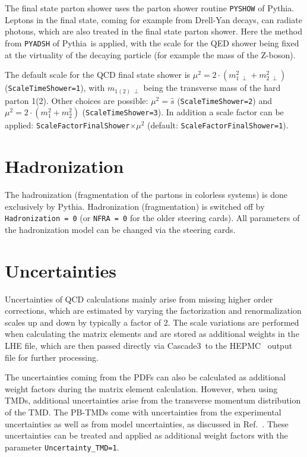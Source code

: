 \documentclass[11pt]{article} \usepackage{mystyle-new}
\def\cascade{{\sc Cascade3}}
\def\PYTHIA{{\sc Pythia}}
\def\PB{{PB}}
\newenvironment{tolerant}[1]{\par\tolerance=#1\relax}{ \par }
\begin{document}
The final state parton shower uses the parton shower routine \verb+PYSHOW+  of \PYTHIA .
Leptons in the final state, coming for example from Drell-Yan decays, can radiate photons, which are also treated in the final state parton shower. Here the method from \verb+PYADSH+ of \PYTHIA\ is applied, with the scale for the QED shower being fixed at the virtuality of the decaying particle (for example the mass of the Z-boson). 

\begin{tolerant}{4000}
The default scale for the QCD final state shower is $\mu^2=2\cdot (m_{1\;\perp}^2+m_{2\;\perp}^2)$ (\verb+ScaleTimeShower=1+),
with $m_{1(2)\;\perp}$ being the transverse mass of the hard parton 1(2). Other choices are possible: $\mu^2=\hat{s}$ (\verb+ScaleTimeShower=2+) and $\mu^2=2\cdot (m_1^2+m_2^2)$ (\verb+ScaleTimeShower=3+). 
In addition a scale factor can be applied: \verb+ScaleFactorFinalShower+$\times\mu^2 $ (default:  \verb+ScaleFactorFinalShower=1+).
\end{tolerant}

\section{Hadronization}
\begin{tolerant}{1000}
The hadronization (fragmentation of the partons in colorless systems) is done exclusively by \PYTHIA . 
Hadronization (fragmentation) is switched off by \verb+Hadronization = 0+ (or \verb+NFRA = 0+ for the older steering cards).
All parameters of the hadronization model can be changed via the steering cards.
\end{tolerant}

\section{Uncertainties}
Uncertainties of QCD calculations mainly arise from missing higher order corrections, which are estimated by varying the factorization and renormalization scales up and down by typically a factor of 2. The scale variations are performed when calculating the matrix elements and are stored as additional weights in the LHE file, which are then passed directly via \cascade\ to the HEPMC~\cite{Dobbs:2001ck} output file for further processing.

The uncertainties coming from the PDFs can also be calculated as additional weight factors during the matrix element calculation. However, when using TMDs, additional uncertainties arise from the transverse momentum distribution of the TMD. The \PB -TMDs come with uncertainties from the experimental uncertainties as well as from model uncertainties, as discussed in Ref.~\cite{Martinez:2018jxt}. These uncertainties can be treated and applied as additional weight factors with the parameter \verb+Uncertainty_TMD=1+.
\end{document}
